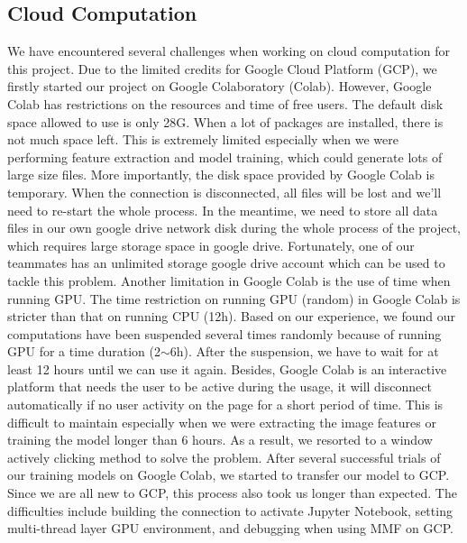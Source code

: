 \documentclass[10pt,twocolumn,letterpaper]{article}
\begin{document}
\subsection{Cloud Computation}
We have encountered several challenges when working on cloud computation for this project. Due to the limited credits for Google Cloud Platform (GCP), we firstly started our project on Google Colaboratory (Colab). However, Google Colab has restrictions on the resources and time of free users. The default disk space allowed to use is only 28G. When a lot of packages are installed, there is not much space left. This is extremely limited especially when we were performing feature extraction and model training, which could generate lots of large size files. More importantly, the disk space provided by Google Colab is temporary. When the connection is disconnected, all files will be lost and we'll need to re-start the whole process. In the meantime, we need to store all data files in our own google drive network disk during the whole process of the project, which requires large storage space in google drive. Fortunately, one of our teammates has an unlimited storage google drive account which can be used to tackle this problem. Another limitation in Google Colab is the use of time when running GPU. The time restriction on running GPU (random) in Google Colab is stricter than that on running CPU (12h). Based on our experience, we found our computations have been suspended several times randomly because of running GPU for a time duration (2$ \sim $6h). After the suspension, we have to wait for at least 12 hours until we can use it again. Besides, Google Colab is an interactive platform that needs the user to be active during the usage, it will disconnect automatically if no user activity on the page for a short period of time. This is difficult to maintain especially when we were extracting the image features or training the model longer than 6 hours. As a result, we resorted to a window actively clicking method to solve the problem. After several successful trials of our training models on Google Colab, we started to transfer our model to GCP. Since we are all new to GCP, this process also took us longer than expected. The difficulties include building the connection to activate Jupyter Notebook, setting multi-thread layer GPU environment, and debugging when using MMF on GCP.
\end{document}
